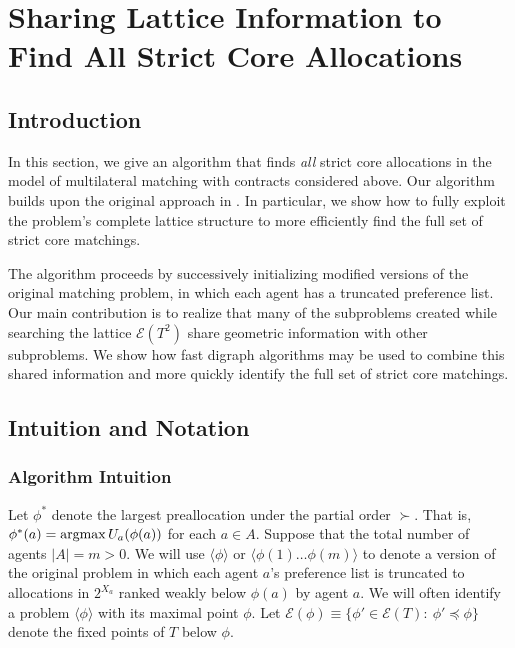 \documentclass[11pt,reqno]{amsart}
\theoremstyle{definition}
\numberwithin{equation}{section}
\newcommand{\argmax}{\operatornamewithlimits{argmax}}
\newcommand{\lag}{\langle}
\newcommand{\rag}{\rangle}
\newcommand{\pre}{\phi}
\newcommand{\fix}{\mathcal{E}}
\newcommand{\peq}{\preceq}
\newcommand{\su}{\succ}
\begin{document}
\section{Sharing Lattice Information to Find All Strict Core Allocations}
\subsection{Introduction}
In this section, we give an algorithm that finds \emph{all} strict core allocations in the model of multilateral matching with contracts considered above.
Our algorithm builds upon the original approach in \cite{EcheniqueYenmez2013}.
In particular, we show how to fully exploit the problem's complete lattice structure to more efficiently find the full set of strict core matchings. 

The algorithm proceeds by successively initializing modified versions of the original matching problem, in which each agent has a truncated preference list.
Our main contribution is to realize that many of the subproblems created while searching the lattice $\fix(T^2)$ share geometric information with other subproblems.
We show how fast digraph algorithms may be used to combine this shared information and more quickly identify the full set of strict core matchings. 

\subsection{Intuition and Notation} \label{section:description1}
\subsubsection{Algorithm Intuition}
Let $\pre^*$ denote the largest preallocation under the partial order $\su$.
That is, $\pre^*(a) = \argmax U_a(\pre(a))$ for each $a \in A$.
Suppose that the total number of agents $|A| = m > 0$.
We will use $\langle \pre \rangle$ or $\langle \pre(1) \hdots \pre(m) \rangle$  to denote a version of the original problem in which each agent $a$'s preference list is truncated to allocations in $2^{X_a}$ ranked weakly below $\pre(a)$ by agent $a$. 
We will often identify a problem $\lag \pre \rag$ with its maximal point $\pre$.
Let $\fix(\pre) \equiv \{\pre' \in \fix(T): \: \pre' \peq \pre\}$ denote the fixed points of $T$ below $\pre$.  
\end{document}
